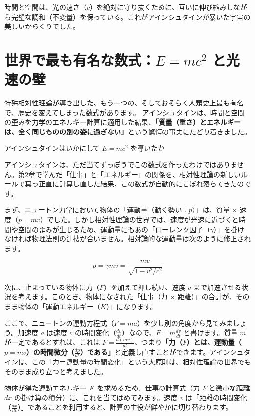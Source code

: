 時間と空間は、光の速さ（\(c\)）を絶対に守り抜くために、互いに伸び縮みしながら完璧な調和（不変量）を保っている。これがアインシュタインが暴いた宇宙の美しいからくりでした。

\section[世界で最も有名な数式：E=mc2 と光速の壁]{世界で最も有名な数式：\ensuremath{E=mc^2} と光速の壁}

特殊相対性理論が導き出した、もう一つの、そしておそらく人類史上最も有名で、歴史を変えてしまった数式があります。 アインシュタインは、時間と空間の歪みを力学のエネルギー計算に適用した結果、\textbf{「質量（重さ）とエネルギーは、全く同じものの別の姿に過ぎない」}という驚愕の事実にたどり着きました。

アインシュタインはいかにして \ensuremath{E=mc^2} を導いたか

アインシュタインは、ただ当てずっぽうでこの数式を作ったわけではありません。第2章で学んだ「仕事」と「エネルギー」の関係を、相対性理論の新しいルールで真っ正直に計算し直した結果、この数式が自動的にこぼれ落ちてきたのです。

まず、ニュートン力学において物体の「運動量（動く勢い：\(p\)）」は、質量 \ensuremath{\times} 速度（\(p = mv\)）でした。しかし相対性理論の世界では、速度が光速に近づくと時間や空間の歪みが生じるため、運動量にもあの「ローレンツ因子（\ensuremath{\gamma}）」を掛けなければ物理法則の辻褄が合いません。相対論的な運動量は次のように修正されます。

\[
p=\gamma mv=\frac{mv}{\sqrt{1-v^2/c^2}}
\]

次に、止まっている物体に力（\(F\)）を加えて押し続け、速度 \(v\) まで加速させる状況を考えます。このとき、物体になされた「仕事（力 \ensuremath{\times} 距離）」の合計が、そのまま物体の「運動エネルギー（\(K\)）」になります。

ここで、ニュートンの運動方程式（\(F = ma\)）を少し別の角度から見てみましょう。加速度 \(a\) は速度 \(v\) の時間変化（\ensuremath{\frac{dv}{dt}}）なので、\(F = m\frac{dv}{dt}\) と書けます。質量 \(m\) が一定であるとすれば、これは \(F = \frac{d(mv)}{dt}\)、つまり\textbf{「力（\(F\)）とは、運動量（\(p=mv\)）の時間微分（\ensuremath{\frac{dp}{dt}}）である」}と定義し直すことができます。アインシュタインは、この「力＝運動量の時間変化」という大原則は、相対性理論の世界でもそのまま成り立つと考えました。

物体が得た運動エネルギー \(K\) を求めるため、仕事の計算式（力 \(F\) と微小な距離 \(dx\) の掛け算の積分）に、これを当てはめてみます。速度 \(v\) は「距離の時間変化（\ensuremath{\frac{dx}{dt}}）」であることを利用すると、計算の主役が鮮やかに切り替わります。

